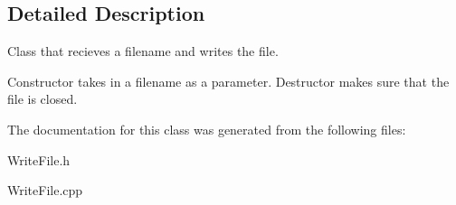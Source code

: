 \subsection{Detailed Description}
Class that recieves a filename and writes the file. 

Constructor takes in a filename as a parameter. Destructor makes sure that the file is closed. 

The documentation for this class was generated from the following files\+:\begin{DoxyCompactItemize}
\item 
Write\+File.\+h\item 
Write\+File.\+cpp\end{DoxyCompactItemize}
